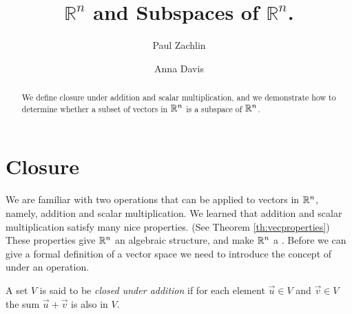 \documentclass{ximera}
\author{Paul Zachlin \and Anna Davis} \title{$\mathbb{R}^n$ and Subspaces of $\mathbb{R}^n$.} \license{CC-BY 4.0}
\begin{document}
\begin{abstract}
We define closure under addition and scalar multiplication, and we demonstrate how to determine whether a subset of vectors in $\mathbb{R}^n$ is a subspace of $\mathbb{R}^n$.
\end{abstract}

\maketitle

\section*{Closure}

We are familiar with two operations that can be applied to vectors in $\mathbb{R}^n$, namely, addition and scalar multiplication. We learned that addition and scalar multiplication satisfy many nice properties. (See Theorem \ref{th:vecproperties}) These properties give $\mathbb{R}^n$ an algebraic structure, and make $\mathbb{R}^n$ a .  Before we can give a formal definition of a vector space we need to introduce the concept of  under an operation.



 \begin{definition} 
  A set $V$ is said to be \emph{closed under addition} if for each element $\vec{u} \in V$ and $\vec{v} \in V$ the sum $\vec{u}+\vec{v}$ is also in $V$.
\end{definition}
\end{document}
